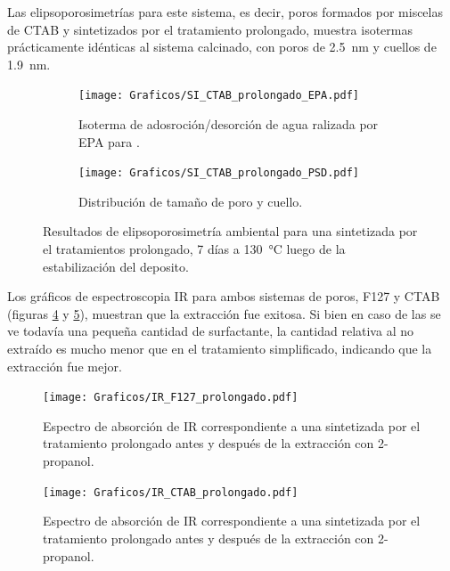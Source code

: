 {		Las elipsoporosimetrías para este sistema, es decir, poros formados por miscelas de CTAB y sintetizados por el tratamiento prolongado, muestra isotermas prácticamente idénticas al sistema calcinado, con poros de \SI{2,5}{nm} y cuellos de \SI{1,9}{nm}.
			     
		 \begin{figure}[!ht]
		  	\begin{subfigure}[t]{0.495\textwidth}
		  	\texttt{[image: Graficos/SI\_CTAB\_prolongado\_EPA.pdf]}
			\caption{Isoterma de adosroción/desorción de agua ralizada por EPA para \pdmC\space.}
			\label{fig:CTAB_prolongado_EPA}
			\end{subfigure}
			\begin{subfigure}[t]{0.495\textwidth}
		  	\texttt{[image: Graficos/SI\_CTAB\_prolongado\_PSD.pdf]}
			\caption{Distribución de tamaño de poro y cuello.\\ }
			\label{fig:CTAB_prolongado_PSD}
			\end{subfigure}
			\caption[Elipsoporosimetría \pdmC\space tratamiento prolongado.]{Resultados de elipsoporosimetría ambiental para una \pdmC\space sintetizada por el tratamientos prolongado, 7 días a \SI{130}{\celsius} luego de la estabilización del deposito.}
			\end{figure}

		Los gráficos de espectroscopia IR para ambos sistemas de poros, F127 y CTAB (figuras \ref{fig:IR_F127_prolongado} y \ref{fig:IR_CTAB_prolongado}),  muestran que la extracción fue exitosa. Si bien en caso de las \pdmC\space se ve todavía una pequeña cantidad de surfactante, la cantidad relativa al no extraído es mucho menor que en el tratamiento simplificado, indicando que la extracción fue mejor. %
		
		\begin{figure}[!ht]
			\begin{center}
			\texttt{[image: Graficos/IR\_F127\_prolongado.pdf]}
			\caption[FTIR \pdmF\space tratamiento prolongado.]{Espectro de absorción de IR correspondiente a una \pdmF\space sintetizada por el tratamiento prolongado antes y después de la extracción con 2-propanol.}
			\label{fig:IR_F127_prolongado}
			\end{center}
			\end{figure}
		
		\begin{figure}[!ht]
			\begin{center}
			\texttt{[image: Graficos/IR\_CTAB\_prolongado.pdf]}
			\caption[FTIR \pdmC\space tratamiento prolongado.]{Espectro de absorción de IR correspondiente a una \pdmC\space sintetizada por el tratamiento prolongado antes y después de la extracción con 2-propanol.}
			\label{fig:IR_CTAB_prolongado}
			\end{center}
			\end{figure}	

}
